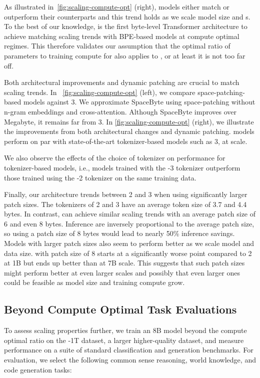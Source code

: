 \documentclass[]{fairmeta}
\begin{document}
As illustrated in~\autoref{fig:scaling-compute-opt} (right), \model{} models either match or outperform their \bpe{} counterparts and this trend holds as we scale model size and \flop{}s. To the best of our knowledge, \model{} is the first byte-level Transformer architecture to achieve matching scaling trends with BPE-based models at compute optimal regimes. This therefore validates our assumption that the optimal ratio of parameters to training compute for \bpe{} also applies to \model{}, or at least it is not too far off.     

Both architectural improvements and dynamic patching are crucial to match \bpe{} scaling trends. In ~\autoref{fig:scaling-compute-opt} (left), we compare space-patching-based models against \llama{} 3. We approximate SpaceByte \citep{slagle2024spacebyte} using \model{} space-patching without n-gram embeddings and cross-attention. 
Although SpaceByte improves over Megabyte, it remains far from  \llama{} 3. In \autoref{fig:scaling-compute-opt} (right), we illustrate the improvements from both architectural changes and dynamic patching. \model{} models perform on par with state-of-the-art tokenizer-based models such as  \llama{} 3, at scale.
 
We also observe the effects of the choice of tokenizer on performance for tokenizer-based models, i.e., models trained with the \llama{}-3 tokenizer outperform those trained using the \llama{}-2 tokenizer on the same training data.

Finally, our \model{} architecture trends between \llama{} 2 and 3 when using significantly larger patch sizes. The \bpe{} tokenizers of \llama{} 2 and 3 have an average token size of 3.7 and 4.4 bytes. In contrast, \model{} can achieve similar scaling trends with an average patch size of 6 and even 8 bytes. Inference \flop{} are inversely proportional to the average patch size, so using a patch size of 8 bytes would lead to nearly 50\% inference \flop{} savings. 
Models with larger patch sizes also seem to perform better as we scale model and data size. \model{} with patch size of 8 starts at a significantly worse point compared to \bpe{} \llama{} 2 at 1B but ends up better than \bpe{} at 7B scale. This suggests that such patch sizes might perform better at even larger scales and possibly that even larger ones could be feasible as model size and training compute grow. 



\subsection{Beyond Compute Optimal Task Evaluations}
\label{section:evals}
To assess scaling properties further, we train an 8B \model{} model beyond the compute optimal ratio on the \model{}-1T dataset, a larger higher-quality dataset, and measure performance on a suite of standard classification and generation benchmarks. For evaluation, we select the following common sense reasoning, world knowledge, and code generation tasks:
\end{document}
